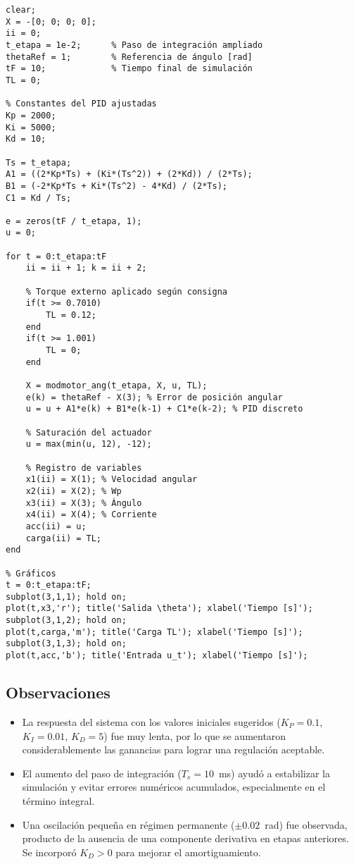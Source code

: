 \documentclass{article}
\begin{document}
\begin{verbatim}
clear;
X = -[0; 0; 0; 0];
ii = 0;
t_etapa = 1e-2;      % Paso de integración ampliado
thetaRef = 1;        % Referencia de ángulo [rad]
tF = 10;             % Tiempo final de simulación
TL = 0;

% Constantes del PID ajustadas
Kp = 2000;
Ki = 5000;
Kd = 10;

Ts = t_etapa;
A1 = ((2*Kp*Ts) + (Ki*(Ts^2)) + (2*Kd)) / (2*Ts);
B1 = (-2*Kp*Ts + Ki*(Ts^2) - 4*Kd) / (2*Ts);
C1 = Kd / Ts;

e = zeros(tF / t_etapa, 1); 
u = 0;

for t = 0:t_etapa:tF
    ii = ii + 1; k = ii + 2;

    % Torque externo aplicado según consigna
    if(t >= 0.7010)
        TL = 0.12;
    end
    if(t >= 1.001)
        TL = 0;
    end

    X = modmotor_ang(t_etapa, X, u, TL);
    e(k) = thetaRef - X(3); % Error de posición angular
    u = u + A1*e(k) + B1*e(k-1) + C1*e(k-2); % PID discreto

    % Saturación del actuador
    u = max(min(u, 12), -12); 

    % Registro de variables
    x1(ii) = X(1); % Velocidad angular
    x2(ii) = X(2); % Wp
    x3(ii) = X(3); % Ángulo
    x4(ii) = X(4); % Corriente
    acc(ii) = u;
    carga(ii) = TL;
end

% Gráficos
t = 0:t_etapa:tF;
subplot(3,1,1); hold on;
plot(t,x3,'r'); title('Salida \theta'); xlabel('Tiempo [s]');
subplot(3,1,2); hold on;
plot(t,carga,'m'); title('Carga TL'); xlabel('Tiempo [s]');
subplot(3,1,3); hold on;
plot(t,acc,'b'); title('Entrada u_t'); xlabel('Tiempo [s]');
\end{verbatim}

\subsection*{Observaciones}

\begin{itemize}
    \item La respuesta del sistema con los valores iniciales sugeridos ($K_P = 0.1$, $K_I = 0.01$, $K_D = 5$) fue muy lenta, por lo que se aumentaron considerablemente las ganancias para lograr una regulación aceptable.
    \item El aumento del paso de integración ($T_s = 10$~ms) ayudó a estabilizar la simulación y evitar errores numéricos acumulados, especialmente en el término integral.
    \item Una oscilación pequeña en régimen permanente ($\pm 0.02$~rad) fue observada, producto de la ausencia de una componente derivativa en etapas anteriores. Se incorporó $K_D > 0$ para mejorar el amortiguamiento.
\end{itemize}
\end{document}
